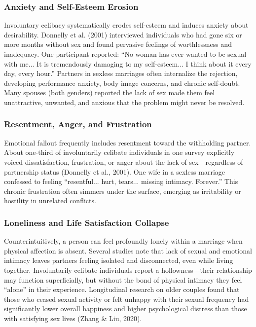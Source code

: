 \documentclass[12pt, letterpaper]{article}
\begin{document}
\subsubsection{Anxiety and Self-Esteem Erosion}

Involuntary celibacy systematically erodes self-esteem and induces anxiety about desirability. Donnelly et al. (2001) interviewed individuals who had gone six or more months without sex and found pervasive feelings of worthlessness and inadequacy. One participant reported: ``No woman has ever wanted to be sexual with me... It is tremendously damaging to my self-esteem... I think about it every day, every hour.'' Partners in sexless marriages often internalize the rejection, developing performance anxiety, body image concerns, and chronic self-doubt. Many spouses (both genders) reported the lack of sex made them feel unattractive, unwanted, and anxious that the problem might never be resolved.

\subsubsection{Resentment, Anger, and Frustration}

Emotional fallout frequently includes resentment toward the withholding partner. About one-third of involuntarily celibate individuals in one survey explicitly voiced dissatisfaction, frustration, or anger about the lack of sex---regardless of partnership status (Donnelly et al., 2001). One wife in a sexless marriage confessed to feeling ``resentful... hurt, tears... missing intimacy. Forever.'' This chronic frustration often simmers under the surface, emerging as irritability or hostility in unrelated conflicts.

\subsubsection{Loneliness and Life Satisfaction Collapse}

Counterintuitively, a person can feel profoundly lonely within a marriage when physical affection is absent. Several studies note that lack of sexual and emotional intimacy leaves partners feeling isolated and disconnected, even while living together. Involuntarily celibate individuals report a hollowness---their relationship may function superficially, but without the bond of physical intimacy they feel ``alone'' in their experience. Longitudinal research on older couples found that those who ceased sexual activity or felt unhappy with their sexual frequency had significantly lower overall happiness and higher psychological distress than those with satisfying sex lives (Zhang \& Liu, 2020).
\end{document}
